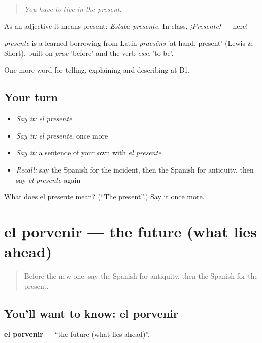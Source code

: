 \begin{quote}
\emph{You have to live in the present.}
\end{quote}

As an adjective it means present: \emph{Estaba presente.} In class, \emph{¡Presente!} — here!

\begin{cousinweb}
\emph{presente} is a learned borrowing from Latin \emph{praesēns} 'at hand, present' (Lewis \& Short), built on \emph{prae} 'before' and the verb \emph{esse} 'to be'.
\end{cousinweb}

\begin{grammarlens}[title={What you've built}]
One more word for telling, explaining and describing at B1.
\end{grammarlens}

\subsection*{Your turn}
\begin{itemize}
\raggedright
  \item \emph{Say it:} \emph{el presente}
  \item \emph{Say it:} \emph{el presente}, once more
  \item \emph{Say it:} a sentence of your own with \emph{el presente}
  \item \emph{Recall:} say the Spanish for the incident, then the Spanish for antiquity, then say \emph{el presente} again
\end{itemize}

\begin{tcolorbox}[breakable,colback=teal!4,colframe=teal!35!black,title={Before you move on}]
What does el presente mean? (\textquotedblleft{}The present\textquotedblright{}.) Say it once more.
\end{tcolorbox}
\section[el porvenir]{el porvenir — the future (what lies ahead)}

\label{lesson:ES-C575-porvenir}



\begin{quote}
Before the new one: say the Spanish for antiquity, then the Spanish for the present.
\end{quote}

\subsection*{You'll want to know: el porvenir}
\textbf{el porvenir} — \textquotedblleft{}the future (what lies ahead)\textquotedblright{}.

